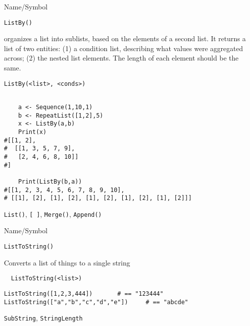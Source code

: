 \begin{desc}{Name/Symbol}
\item[Name/Symbol]	\verb+ListBy()+

\item[Description]	organizes a list into sublists, based on the
  elements of a second list.  It returns a list of two entities: (1) a
  condition list, describing what values were aggregated across; (2)
  the nested list elements.  The length of each element should be the same.

\item[Usage]
\begin{verbatim}
ListBy(<list>, <conds>)
\end{verbatim}

\item[Example]
\begin{verbatim}

	a <- Sequence(1,10,1)
    b <- RepeatList([1,2],5)
    x <- ListBy(a,b)
    Print(x)
#[[1, 2],
#  [[1, 3, 5, 7, 9],
#   [2, 4, 6, 8, 10]]
#]

    Print(ListBy(b,a))
#[[1, 2, 3, 4, 5, 6, 7, 8, 9, 10],
# [[1], [2], [1], [2], [1], [2], [1], [2], [1], [2]]]

\end{verbatim}

\item[See Also]	\verb+List()+, \verb+[ ]+, \verb+Merge()+, \verb+Append()+
\end{desc}

\rl

 
\begin{desc}{Name/Symbol}
\item[Name/Symbol]	\verb+ListToString()+

\item[Description]	Converts a list of things to a single string

\item[Usage]
\begin{verbatim}
  ListToString(<list>)
\end{verbatim}

\item[Example]
\begin{verbatim}
ListToString([1,2,3,444])		# == "123444"
ListToString(["a","b","c","d","e"])		# == "abcde"

\end{verbatim}

\item[See Also] \verb+SubString+, \verb+StringLength+
\end{desc}

